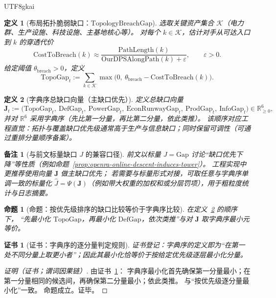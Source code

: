 \documentclass[12pt]{article}
\newtheorem{definition}{定义}[section]
\newtheorem{proposition}{命题}[section]
\newtheorem{remark}{备注}[section]
\newtheorem{Certificate}{证书}[section]
\newcommand{\RR}{\mathbb{R}}
\begin{document}
\begin{CJK*}{UTF8}{gkai}
\begin{definition}[布局拓扑脆弱缺口：$\mathrm{TopologyBreachGap}$]
\label{def:openra-gap-topology}
选取关键资产集合 $\mathcal{K}$（电力群、生产设施、科技设施、主基地核心等）。
对每个 $k\in\mathcal{K}$，估计对手从可达入口到 $k$ 的穿透代价
\[
  \mathrm{CostToBreach}(k)
  \approx
  \frac{\mathrm{PathLength}(k)}{\mathrm{OurDPSAlongPath}(k)+\varepsilon},
  \qquad \varepsilon>0.
\]
给定阈值 $\theta_{\mathrm{breach}}>0$，定义
\[
  \mathrm{TopoGap}_t
  :=
  \sum_{k\in\mathcal{K}} \max\bigl(0,\ \theta_{\mathrm{breach}}-\mathrm{CostToBreach}(k)\bigr).
\]
\end{definition}

\begin{definition}[字典序总缺口向量（主缺口优先）]
\label{def:openra-gap-vector-lex}
定义总缺口向量
\[
  \mathbf{J}_t
  :=
  \bigl(
    \mathrm{TopoGap}_t,\ \mathrm{DefGap}_t,\ \mathrm{PowerGap}_t,\ \mathrm{EconRunwayGap}_t,\ \mathrm{ProdGap}_t,\
      \mathrm{InfoGap}_t
  \bigr)\in\RR_{\ge 0}^6,
\]
并对 $\RR^6$ 采用字典序（先比第一分量，再比第二分量，依此类推）。
该顺序对应工程直觉：拓扑与覆盖缺口优先级通常高于生产与信息缺口；同时保留可调性（可通过重排分量顺序备案）。
\end{definition}

\begin{remark}[与前文标量缺口 $J$ 的兼容口径]
前文以标量 $J=\mathrm{Gap}$ 讨论“缺口优先下降”等性质（例如命题~\ref{prop:openra-online-descent-induces-tower}）。
工程实现中更推荐使用向量 $\mathbf{J}$ 做主缺口优先；
若需要与标量形式对接，可取任意与字典序单调一致的标量化 $\widehat{J}=\Psi(\mathbf{J})$（例如带大权重的加权和或分层罚项），用于粗粒度统计与日志摘要。
\end{remark}

\begin{proposition}[命题：按优先级排序的缺口比较等价于字典序比较]
\label{prop:openra-gap-lex-ordering}
在定义~\ref{def:openra-gap-vector-lex} 的顺序下，
“先最小化 $\mathrm{TopoGap}$，再最小化 $\mathrm{DefGap}$，依次类推”与对 $\mathbf{J}$ 取字典序最小元等价。
\end{proposition}

\begin{Certificate}[证书：字典序的逐分量判定规则]
\label{cert:openra-gap-lex-ordering}
证书登记：字典序的定义即为“在第一处不同分量上取更小者”；因此其最小化恰等价于按给定优先级逐层最小化分量。
\end{Certificate}

\begin{proof}[证明（证书；谓词因果链）]
由证书~\ref{cert:openra-gap-lex-ordering}：
字典序最小化首先确保第一分量最小；在第一分量相同的候选间，再确保第二分量最小；依此类推。
与“按优先级逐分量最小化”一致。
命题成立。证毕。
\end{proof}


\end{CJK*}
\end{document}
